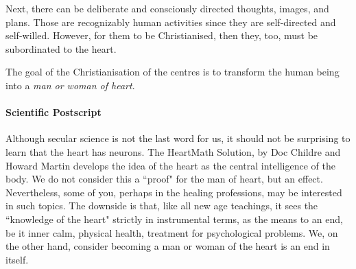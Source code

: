 Next, there can be deliberate and consciously directed thoughts, images, and plans. Those are recognizably human activities since they are self-directed and self-willed. However, for them to be Christianised, then they, too, must be subordinated to the heart.

The goal of the Christianisation of the centres is to transform the human being into a \emph{man or woman of heart}.

\paragraph{Scientific Postscript}
Although secular science is not the last word for us, it should not be surprising to learn that the heart has neurons. The HeartMath Solution, by Doc Childre and Howard Martin develops the idea of the heart as the central intelligence of the body. We do not consider this a ``proof" for the man of heart, but an effect. Nevertheless, some of you, perhaps in the healing professions, may be interested in such topics. The downside is that, like all new age teachings, it sees the ``knowledge of the heart" strictly in instrumental terms, as the means to an end, be it inner calm, physical health, treatment for psychological problems. We, on the other hand, consider becoming a man or woman of the heart is an end in itself.



